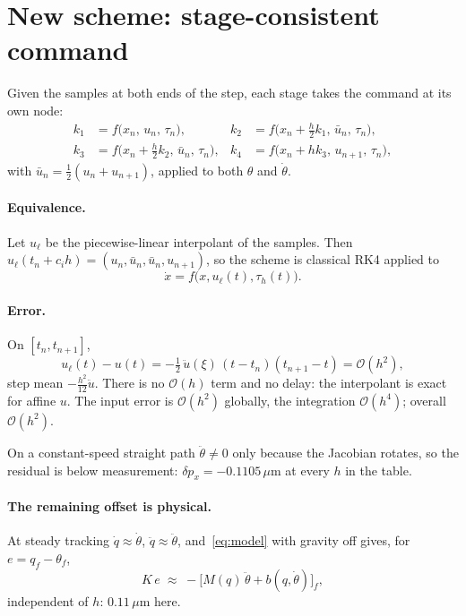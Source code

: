 \documentclass[11pt]{article}
\begin{document}
\section{New scheme: stage-consistent command}\label{sec:new}

Given the samples at both ends of the step, each stage takes the command at its own node:
\begin{align}
  k_1&=f\big(x_n,\,u_n,\,\tau_n\big), &
  k_2&=f\big(x_n+\tfrac h2k_1,\,\bar u_n,\,\tau_n\big),\nonumber\\
  k_3&=f\big(x_n+\tfrac h2k_2,\,\bar u_n,\,\tau_n\big), &
  k_4&=f\big(x_n+hk_3,\,u_{n+1},\,\tau_n\big),
\end{align}
with $\bar u_n=\tfrac12(u_n+u_{n+1})$, applied to both $\theta$ and $\dot\theta$.

\paragraph{Equivalence.} Let $u_\ell$ be the piecewise-linear interpolant of the samples. Then
$u_\ell(t_n+c_ih)=(u_n,\bar u_n,\bar u_n,u_{n+1})$, so the scheme is classical RK4 applied to
\begin{equation}
  \dot x=f\big(x,u_\ell(t),\tau_h(t)\big).
\end{equation}

\paragraph{Error.} On $[t_n,t_{n+1}]$,
\begin{equation}
  u_\ell(t)-u(t)=-\tfrac12\,\ddot u(\xi)\,(t-t_n)(t_{n+1}-t)=\mathcal O(h^2),
\end{equation}
step mean $-\tfrac{h^2}{12}\ddot u$. There is no $\mathcal O(h)$ term and no delay: the
interpolant is exact for affine $u$. The input error is $\mathcal O(h^2)$ globally, the
integration $\mathcal O(h^4)$; overall $\mathcal O(h^2)$.

On a constant-speed straight path $\ddot\theta\neq0$ only because the Jacobian rotates, so the
residual is below measurement: $\delta p_x=-0.1105\,\mu$m at every $h$ in the table.

\paragraph{The remaining offset is physical.} At steady tracking $\dot q\approx\dot\theta$,
$\ddot q\approx\ddot\theta$, and~\eqref{eq:model} with gravity off gives, for
$e=q_f-\theta_f$,
\begin{equation}
  K\,e\;\approx\;-\big[M(q)\,\ddot\theta+b(q,\dot\theta)\big]_f,
\end{equation}
independent of $h$: $0.11\,\mu$m here.
\end{document}
